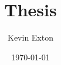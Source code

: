 \documentclass[11pt, a4paper, draft]{report}
\title{Thesis}
\author{Kevin Exton}
\date{\today}
\begin{document}
\maketitle
\renewcommand{\abstractname}{Executive Summary}
\begin{abstract}

\end{abstract}
\tableofcontents


\newpage


\end{document}
